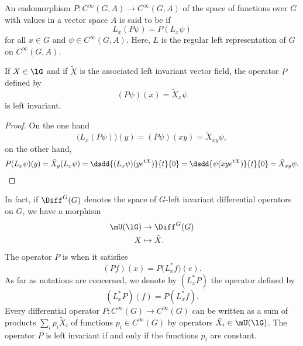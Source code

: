 An endomorphism $P\colon C^{\infty}(G,A)\to  C^{\infty}(G,A)$ of the space of functions over $G$ with values in a vector space $A$ is said to be  if
\begin{equation}  \label{EqDefLxinvarop}
	L_{x}(P\psi)=P(L_{x}\psi)
\end{equation}
for all $x\in G$ and $\psi\in C^{\infty}(G,A)$. Here, $L$ is the regular left representation of $G$ on $ C^{\infty}(G,A)$. 

\begin{lemma}
	If $X\in\lG$ and if $\tilde X$ is the associated left invariant vector field, the operator $P$ defined by 
	\begin{equation}
		(P\psi)(x)=\tilde X_{x}\psi
	\end{equation}
	is left invariant. 
\end{lemma}

\begin{proof}
	On the one hand
	\[ 
	  \big( L_{x}(P\psi) \big)(y)=(P\psi)(xy)=\tilde X_{xy}\psi,
	\]
	on the other hand,
	\begin{equation}
		\begin{aligned}[]
			P(L_{x}\psi)(y)=\tilde X_{y}(L_{x}\psi)
				=\dsdd{ (L_{x}\psi)(y e^{tX}) }{t}{0}
				=\dsdd{ \psi(xy e^{tX}) }{t}{0}
				=\tilde X_{xy}\psi.
		\end{aligned}
	\end{equation}
\end{proof}

In fact, if $\Diff^G(G)$ denotes the space of $G$-left invariant differential operators on $G$, we have a morphism
\begin{equation}		\label{EqMorphismUgDiff}
	\begin{aligned}
		\mU(\lG)&\to \Diff^{G}(G) \\
		X&\mapsto \tilde X. 
	\end{aligned}
\end{equation}
The operator $P$ is  when it satisfies
\begin{equation}
	(Pf)(x)=P\big( L_x^*f \big)(e).
\end{equation}
As far as notations are concerned, we denote by $(L^*_xP)$ the operator defined by
\begin{equation}
	(L^*_xP)(f)=P(L^*_xf).
\end{equation}
Every differential operator $P\colon  C^{\infty}(G)\to  C^{\infty}(G)$ can be written as a sum of products $\sum_ip_i\tilde X_i$ of functions $p_i\in C^{\infty}(G)$ by operators $\tilde X_i\in\mU(\lG)$. The operator $P$ is left invariant if and only if the functions $p_i$ are constant.

